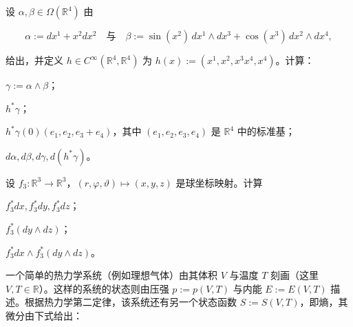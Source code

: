 \begin{exercises}
\item

设 $ \alpha, \beta \in \Omega(\mathbb{R}^4) $ 由

\[
\alpha := dx^1 + x^2 dx^2 \quad \text{与} \quad \beta := \sin(x^2)\, dx^1 \wedge dx^3 + \cos(x^3)\, dx^2 \wedge dx^4 ,
\]

给出，并定义 $ h \in C^\infty(\mathbb{R}^4, \mathbb{R}^4) $ 为 $ h(x) := (x^1, x^2, x^3 x^4, x^4) $。计算：

\begin{subitems}
\item

$ \gamma := \alpha \wedge \beta $；

\item

$ h^*\gamma $；

\item

$ h^*\gamma(0)(e_1, e_2, e_3 + e_4) $，其中 $ (e_1, e_2, e_3, e_4) $ 是 $ \mathbb{R}^4 $ 中的标准基；

\item

$ d\alpha, d\beta, d\gamma, d(h^*\gamma) $。

\end{subitems}

\item

设 $ f_3: \mathbb{R}^3 \to \mathbb{R}^3 $，$ (r, \varphi, \vartheta) \mapsto (x, y, z) $ 是球坐标映射。计算

\begin{items}
\item

$ f_3^* dx, f_3^* dy, f_3^* dz $；

\item

$ f_3^*(dy \wedge dz) $；

\item

$ f_3^* dx \wedge f_3^*(dy \wedge dz) $。

\end{items}

\item

一个简单的热力学系统（例如理想气体）由其体积 $ V $ 与温度 $ T $ 刻画（这里 $ V, T \in \mathbb{R} $）。这样的系统的状态则由压强 $ p := p(V, T) $ 与内能 $ E := E(V, T) $ 描述。根据热力学第二定律，该系统还有另一个状态函数 $ S := S(V, T) $，即熵，其微分由下式给出：


\end{exercises}
